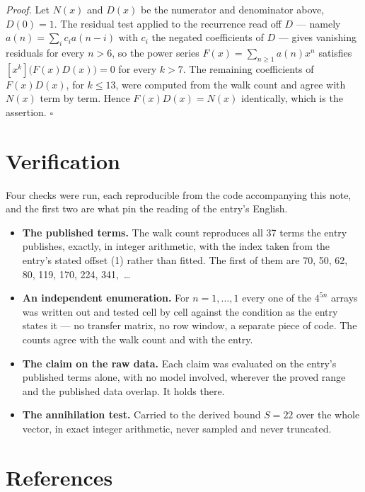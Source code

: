 \documentclass[11pt]{article}
\theoremstyle{definition}
\begin{document}
{\itshape Proof.} Let $N(x)$ and $D(x)$ be the numerator and denominator above, $D(0)=1$. The residual test applied to the recurrence read off $D$ --- namely $a(n) = \sum_i c_i a(n-i)$ with $c_i$ the negated coefficients of $D$ --- gives vanishing residuals for every $n > 6$, so the power series $F(x)=\sum_{n\ge 1}a(n)x^n$ satisfies $[x^k]\bigl(F(x)D(x)\bigr) = 0$ for every $k > 7$. The remaining coefficients of $F(x)D(x)$, for $k \le 13$, were computed from the walk count and agree with $N(x)$ term by term. Hence $F(x)D(x) = N(x)$ identically, which is the assertion. $\square$

\section{Verification}

Four checks were run, each reproducible from the code accompanying this note, and the first two are what pin the reading of the entry's English.

\begin{itemize}

\item {\bfseries The published terms.} The walk count reproduces all 37 terms the entry publishes, exactly, in integer arithmetic, with the index taken from the entry's stated offset (1) rather than fitted. The first of them are 70, 50, 62, 80, 119, 170, 224, 341,~\dots

\item {\bfseries An independent enumeration.} For $n = 1,\dots,1$ every one of the $4^{5n}$ arrays was written out and tested cell by cell against the condition as the entry states it --- no transfer matrix, no row window, a separate piece of code. The counts agree with the walk count and with the entry.

\item {\bfseries The claim on the raw data.} Each claim was evaluated on the entry's published terms alone, with no model involved, wherever the proved range and the published data overlap. It holds there.

\item {\bfseries The annihilation test.} Carried to the derived bound $S = 22$ over the whole vector, in exact integer arithmetic, never sampled and never truncated.

\end{itemize}

\section{References}
\end{document}
